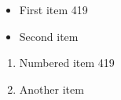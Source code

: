\documentclass{article}
\begin{document}
\begin{itemize}
\item First item 419
\item Second item
\end{itemize}
\begin{enumerate}
\item Numbered item 419
\item Another item
\end{enumerate}
\end{document}
